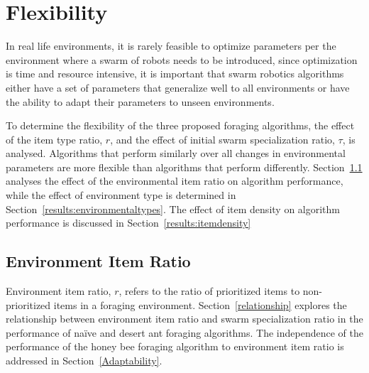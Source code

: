 \section{Flexibility}
\label{results:flexibility}

In real life environments, it is rarely feasible to optimize parameters per the environment where a swarm of robots needs to be introduced, since optimization is time and resource intensive, it is important that swarm robotics algorithms either have a set of parameters that generalize well to all environments or have the ability to adapt their parameters to unseen environments.

To determine the flexibility of the three proposed foraging algorithms, the effect of the item type ratio, $r$, and the effect of initial swarm specialization ratio, $\tau$, is analysed. Algorithms that perform similarly over all changes in environmental parameters are more flexible than algorithms that perform differently. Section~\ref{results:ratio} analyses the effect of the environmental item ratio on algorithm performance, while the effect of environment type is determined in Section~\ref{results:environmentaltypes}. The effect of item density on algorithm performance is discussed in Section~\ref{results:itemdensity}

\subsection{Environment Item Ratio}
\label{results:ratio}

Environment item ratio, $r$, refers to the ratio of prioritized items to non-prioritized items in a foraging environment. 
Section~\ref{relationship} explores the relationship between environment item ratio and swarm specialization ratio in the performance of na\"ive and desert ant foraging algorithms. The independence of the performance of the honey bee foraging algorithm to environment item ratio is addressed in Section~\ref{Adaptability}.


